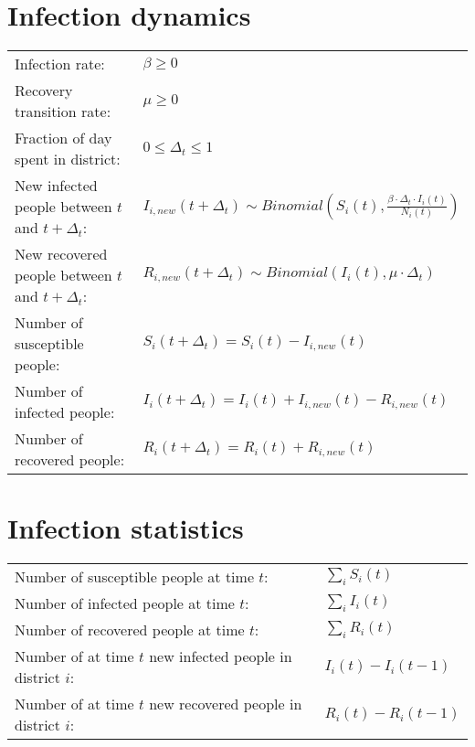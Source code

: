 \documentclass[preprint,12pt]{elsarticle}
\begin{document}
\section{Infection dynamics}
\noindent\begin{tabular}[t]{@{}p{9cm}p{7cm}}

Infection rate: &$\beta \geq 0$ \\
Recovery transition rate: &$\mu \geq 0$ \\
Fraction of day spent in district: &$0\le \Delta_t\le 1$ \\
New infected people between $t$ and $t+\Delta_t$:  &$I_{i,new}(t + \Delta_t) \sim Binomial\left(S_i\left(t\right),\frac{\beta\cdot\Delta_t\cdot I_i\left(t\right)}{N_i\left(t\right)}\right)$ \\
New recovered people between $t$ and $t+\Delta_t$: & $ R_{i,new}(t + \Delta_t) \sim Binomial\left(I_i\left(t\right),\mu\cdot\Delta_t\right)$\\

Number of susceptible people:
&$S_i\left(t+\Delta_t\right)=S_i\left(t\right)-I_{i,new}(t)$ \\

Number of infected people:
 &$I_i\left(t+\Delta_t\right)=I_i\left(t\right)+I_{i,new}(t)- R_{i,new}(t)$ \\
Number of recovered people:

&$R_i\left(t+\Delta_t\right)=R_i\left(t\right)+R_{i,new}(t)$
\end{tabular}

\section{Infection statistics}
\noindent\begin{tabular}[t]{@{}p{9cm}p{7cm}}

Number of susceptible people at time $t$: & $\sum_i S_i(t)$ \\
Number of infected people at time $t$: & $\sum_i I_i(t)$ \\
Number of recovered people at time $t$: & $\sum_i R_i(t)$ \\
Number of at time $t$ new infected people in district $i$: &$I_i(t) - I_i(t-1)$ \\
Number of at time $t$ new recovered people in district $i$: &$R_i(t) - R_i(t-1)$
\end{tabular}
\end{document}
